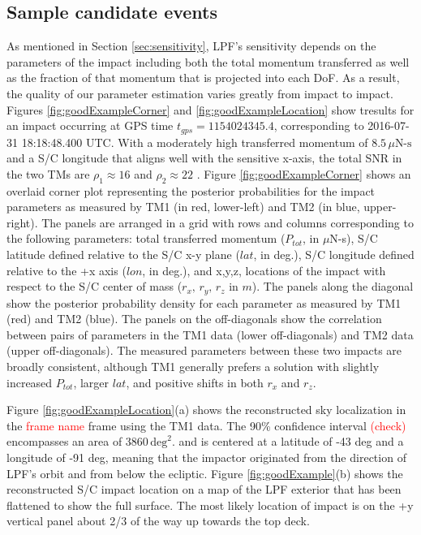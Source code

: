 \documentclass[twocolumn, trackchanges]{aastex61}
\newcommand{\red}[1]{\textcolor{red}{#1}}
\begin{document}
\subsection{Sample candidate events \label{sec:samples}}
As mentioned in Section \ref{sec:sensitivity}, LPF's sensitivity depends on the parameters of the impact including both the total momentum transferred as well as the fraction of that momentum that is  projected into each DoF.  As a result, the quality of our parameter estimation varies greatly from impact to impact.  Figures \ref{fig:goodExampleCorner} and \ref{fig:goodExampleLocation} show tresults for an impact occurring at GPS time $t_{gps}=1154024345.4$, corresponding to 2016-07-31 18:18:48.400 UTC. With a moderately high transferred momentum of $8.5\,\mu\textrm{N-s}$ and a S/C longitude that aligns well with the sensitive x-axis, the total SNR in the two TMs are $\rho_1\approx16$ and $\rho_2\approx22$ . Figure \ref{fig:goodExampleCorner} shows an overlaid corner plot representing the posterior probabilities for the impact parameters as measured by TM1 (in red, lower-left) and TM2 (in blue, upper-right).  The panels are arranged in a grid with rows and columns corresponding to the following parameters: total transferred momentum ($P_{tot}$, in $\mu$N-s), S/C latitude defined relative to the S/C x-y plane ($lat$, in deg.), S/C longitude defined relative to the +x axis ($lon$, in deg.), and x,y,z, locations of the impact with respect to the S/C center of mass ($r_x,\,r_y,\,r_z$ in $m$).  The panels along the diagonal show the posterior probability density for each parameter as measured by TM1 (red) and TM2 (blue).  The panels on the off-diagonals show the correlation between pairs of parameters in the TM1 data (lower off-diagonals) and TM2 data (upper off-diagonals). The measured parameters between these two impacts are broadly consistent, although TM1 generally prefers a solution with slightly increased $P_{tot}$, larger $lat$, and positive shifts in both $r_x$ and $r_z$. 

Figure \ref{fig:goodExampleLocation}(a) shows the reconstructed sky localization in the \red{frame name} frame using the TM1 data.  The 90\% confidence interval \red{(check)} encompasses an area of 3860$\,\textrm{deg}^2$. and is centered at a latitude of -43 deg and a longitude of -91 deg, meaning that the impactor originated from the direction of LPF's orbit and from below the ecliptic. Figure \ref{fig:goodExample}(b) shows the reconstructed S/C impact location on a map of the LPF exterior that has been flattened to show the full surface.  The most likely location of impact is on the +y vertical panel about 2/3 of the way up towards the top deck. 
\end{document}
